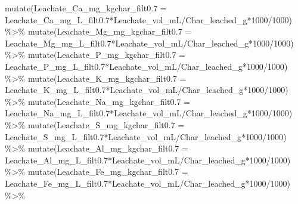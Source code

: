 \documentclass[
]{article}
\newenvironment{Shaded}{\begin{snugshade}}{\end{snugshade}}
\newcommand{\AttributeTok}[1]{\textcolor[rgb]{0.77,0.63,0.00}{#1}}
\newcommand{\DecValTok}[1]{\textcolor[rgb]{0.00,0.00,0.81}{#1}}
\newcommand{\FloatTok}[1]{\textcolor[rgb]{0.00,0.00,0.81}{#1}}
\newcommand{\FunctionTok}[1]{\textcolor[rgb]{0.00,0.00,0.00}{#1}}
\newcommand{\NormalTok}[1]{#1}
\newcommand{\SpecialCharTok}[1]{\textcolor[rgb]{0.00,0.00,0.00}{#1}}
\begin{document}
\begin{Shaded}
\begin{Highlighting}[]
  \FunctionTok{mutate}\NormalTok{(}\AttributeTok{Leachate\_Ca\_mg\_kgchar\_filt0.7 =}\NormalTok{ Leachate\_Ca\_mg\_L\_filt0}\FloatTok{.7}\SpecialCharTok{*}\NormalTok{Leachate\_vol\_mL}\SpecialCharTok{/}\NormalTok{Char\_leached\_g}\SpecialCharTok{*}\DecValTok{1000}\SpecialCharTok{/}\DecValTok{1000}\NormalTok{) }\SpecialCharTok{\%\textgreater{}\%}
  \FunctionTok{mutate}\NormalTok{(}\AttributeTok{Leachate\_Mg\_mg\_kgchar\_filt0.7 =}\NormalTok{ Leachate\_Mg\_mg\_L\_filt0}\FloatTok{.7}\SpecialCharTok{*}\NormalTok{Leachate\_vol\_mL}\SpecialCharTok{/}\NormalTok{Char\_leached\_g}\SpecialCharTok{*}\DecValTok{1000}\SpecialCharTok{/}\DecValTok{1000}\NormalTok{) }\SpecialCharTok{\%\textgreater{}\%}
  \FunctionTok{mutate}\NormalTok{(}\AttributeTok{Leachate\_P\_mg\_kgchar\_filt0.7 =}\NormalTok{ Leachate\_P\_mg\_L\_filt0}\FloatTok{.7}\SpecialCharTok{*}\NormalTok{Leachate\_vol\_mL}\SpecialCharTok{/}\NormalTok{Char\_leached\_g}\SpecialCharTok{*}\DecValTok{1000}\SpecialCharTok{/}\DecValTok{1000}\NormalTok{) }\SpecialCharTok{\%\textgreater{}\%}
  \FunctionTok{mutate}\NormalTok{(}\AttributeTok{Leachate\_K\_mg\_kgchar\_filt0.7 =}\NormalTok{ Leachate\_K\_mg\_L\_filt0}\FloatTok{.7}\SpecialCharTok{*}\NormalTok{Leachate\_vol\_mL}\SpecialCharTok{/}\NormalTok{Char\_leached\_g}\SpecialCharTok{*}\DecValTok{1000}\SpecialCharTok{/}\DecValTok{1000}\NormalTok{) }\SpecialCharTok{\%\textgreater{}\%}
  \FunctionTok{mutate}\NormalTok{(}\AttributeTok{Leachate\_Na\_mg\_kgchar\_filt0.7 =}\NormalTok{ Leachate\_Na\_mg\_L\_filt0}\FloatTok{.7}\SpecialCharTok{*}\NormalTok{Leachate\_vol\_mL}\SpecialCharTok{/}\NormalTok{Char\_leached\_g}\SpecialCharTok{*}\DecValTok{1000}\SpecialCharTok{/}\DecValTok{1000}\NormalTok{) }\SpecialCharTok{\%\textgreater{}\%}
  \FunctionTok{mutate}\NormalTok{(}\AttributeTok{Leachate\_S\_mg\_kgchar\_filt0.7 =}\NormalTok{ Leachate\_S\_mg\_L\_filt0}\FloatTok{.7}\SpecialCharTok{*}\NormalTok{Leachate\_vol\_mL}\SpecialCharTok{/}\NormalTok{Char\_leached\_g}\SpecialCharTok{*}\DecValTok{1000}\SpecialCharTok{/}\DecValTok{1000}\NormalTok{) }\SpecialCharTok{\%\textgreater{}\%}
  \FunctionTok{mutate}\NormalTok{(}\AttributeTok{Leachate\_Al\_mg\_kgchar\_filt0.7 =}\NormalTok{ Leachate\_Al\_mg\_L\_filt0}\FloatTok{.7}\SpecialCharTok{*}\NormalTok{Leachate\_vol\_mL}\SpecialCharTok{/}\NormalTok{Char\_leached\_g}\SpecialCharTok{*}\DecValTok{1000}\SpecialCharTok{/}\DecValTok{1000}\NormalTok{) }\SpecialCharTok{\%\textgreater{}\%}
  \FunctionTok{mutate}\NormalTok{(}\AttributeTok{Leachate\_Fe\_mg\_kgchar\_filt0.7 =}\NormalTok{ Leachate\_Fe\_mg\_L\_filt0}\FloatTok{.7}\SpecialCharTok{*}\NormalTok{Leachate\_vol\_mL}\SpecialCharTok{/}\NormalTok{Char\_leached\_g}\SpecialCharTok{*}\DecValTok{1000}\SpecialCharTok{/}\DecValTok{1000}\NormalTok{) }\SpecialCharTok{\%\textgreater{}\%}

\end{Highlighting}
\end{Shaded}
\end{document}
